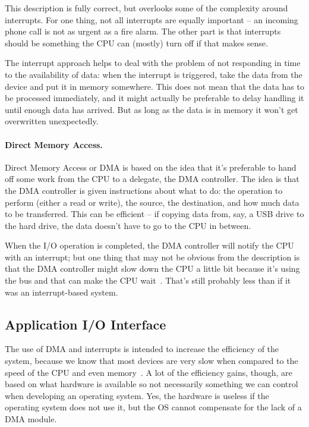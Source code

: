 This description is fully correct, but overlooks some of the complexity around interrupts. For one thing, not all interrupts are equally important -- an incoming phone call is not as urgent as a fire alarm. The other part is that interrupts should be something the CPU can (mostly) turn off if that makes sense. 

The interrupt approach helps to deal with the problem of not responding in time to the availability of data: when the interrupt is triggered, take the data from the device and put it in memory somewhere. This does not mean that the data has to be processed immediately, and it might actually be preferable to delay handling it until enough data has arrived. But as long as the data is in memory it won't get overwritten unexpectedly. 

\paragraph{Direct Memory Access.} 
Direct Memory Access or DMA is based on the idea that it's preferable to hand off some work from the CPU to a delegate, the DMA controller. The idea is that the DMA controller is given instructions about what to do: the operation to perform (either a read or write), the source, the destination, and how much data to be transferred. This can be efficient -- if copying data from, say, a USB drive to the hard drive, the data doesn't have to go to the CPU in between.

When the I/O operation is completed, the DMA controller will notify the CPU with an interrupt; but one thing that may not be obvious from the description is that the DMA controller might slow down the CPU a little bit because it's using the bus and that can make the CPU wait~\cite{osc}. That's still probably less than if it was an interrupt-based system. 

\subsection*{Application I/O Interface}
The use of DMA and interrupts is intended to increase the efficiency of the system, because we know that most devices are very slow when compared to the speed of the CPU and even memory~\cite{osi}. A lot of the efficiency gains, though, are based on what hardware is available so not necessarily something we can control when developing an operating system. Yes, the hardware is useless if the operating system does not use it, but the OS cannot compensate for the lack of a DMA module.

